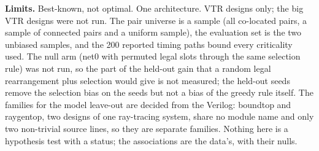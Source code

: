 \textbf{Limits.} Best-known, not optimal. One architecture. VTR designs only; the big VTR designs were not run. The pair universe is a sample (all
co-located pairs, a sample of connected pairs and a uniform sample), the evaluation set is the two unbiased samples, and the 200 reported timing paths bound
every criticality used. The null arm (net0 with permuted legal slots through the same selection rule) was not run, so the part of the held-out gain that a random legal rearrangement plus selection would give is not measured; the held-out seeds remove the selection bias on the seeds but not a bias of the greedy rule itself. The families for the model leave-out are decided from the Verilog: boundtop and raygentop, two designs of one ray-tracing system, share no module name and only two non-trivial source lines, so they are separate families. Nothing here is a hypothesis test with a status; the associations are the data's, with their nulls.
